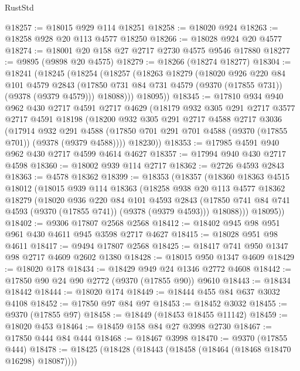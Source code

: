 \begin{lexlean}{RustStd}
\begin{coremodule}
@18257 := @18015 @929 @114 @18251
@18258 := @18020 @924
@18263 := @18258 @928 @20 @113 @4577 @18250
@18266 := @18028 @924 @20 @4577
@18274 := @18001 @20 @158 @27 @2717 @2730 @4575 @9546 @17880
@18277 := @9895 (@9898 @20 @4575)
@18279 := @18266 (@18274 @18277)
@18304 := @18241
    (@18245
      (@18254
        (@18257
          (@18263
            @18279
            (@18020
              @926
              @220
              @84
              @101
              @4579
              @2843
              (@17850 @731 @84 @731 @4579 (@9370 (@17855 @731)) (@9378 (@9379 @4579)))
              @18088)))
        @18095))
@18345 := @17810
    @934
    @940
    @962
    @430
    @2717
    @4591
    @2717
    @4629
    (@18179
      @932
      @305
      @291
      @2717
      @3577
      @2717
      @4591
      @18198
      (@18200
        @932
        @305
        @291
        @2717
        @4588
        @2717
        @3036
        (@17914
          @932
          @291
          @4588
          (@17850 @701 @291 @701 @4588 (@9370 (@17855 @701)) (@9378 (@9379 @4588))))
        @18230))
@18353 := @17985 @4591 @940 @962 @430 @2717 @4599 @4614 @4627
@18357 := @17994 @940 @430 @2717 @4598
@18360 := @18002 @939 @114 @2717
@18362 := @2726 @4593 @2843
@18363 := @4578 @18362
@18399 := @18353
    (@18357
      (@18360
        @18363
        @4515
        @18012
        (@18015
          @939
          @114
          @18363
          (@18258
            @938
            @20
            @113
            @4577
            @18362
            @18279
            (@18020
              @936
              @220
              @84
              @101
              @4593
              @2843
              (@17850 @741 @84 @741 @4593 (@9370 (@17855 @741)) (@9378 (@9379 @4593)))
              @18088)))
        @18095))
@18402 := @9306 @17807 @2568 @2568
@18412 := @18402 @945 @98 @951 @961 @430 @4611 @945 @3598 @2717 @4627
@18415 := @18028 @951 @98 @4611
@18417 := @9494 @17807 @2568
@18425 := @18417 @741 @950 @1347 @98 @2717 @4609 @2602 @1380
@18428 := @18015 @950 @1347 @4609
@18429 := @18020 @178
@18434 := @18429 @949 @24 @1346 @2772 @4608
@18442 := @17850 @90 @24 @90 @2772 (@9370 (@17855 @90)) @9610
@18443 := @18434 @18442
@18444 := @18020 @174
@18449 := @18444 @455 @84 @637 @3032 @4108
@18452 := @17850 @97 @84 @97
@18453 := @18452 @3032
@18455 := @9370 (@17855 @97)
@18458 := @18449 (@18453 @18455 @11142)
@18459 := @18020 @453
@18464 := @18459 @158 @84 @27 @3998 @2730
@18467 := @17850 @444 @84 @444
@18468 := @18467 @3998
@18470 := @9370 (@17855 @444)
@18478 := @18425 (@18428 (@18443 (@18458 (@18464 (@18468 @18470 @16298) @18087))))

\end{coremodule}
\end{lexlean}
